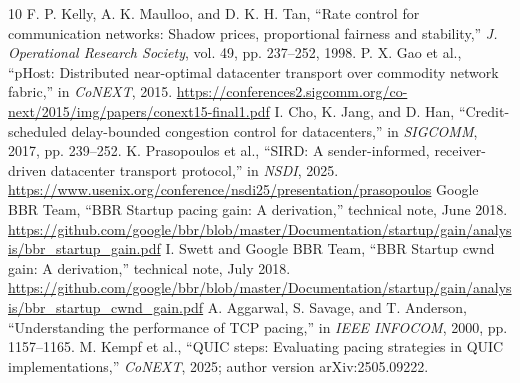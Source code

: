 \documentclass[conference,letterpaper]{IEEEtran}
\begin{document}
\begin{thebibliography}{10}
 F. P. Kelly, A. K. Maulloo, and D. K. H. Tan, ``Rate control for communication networks: Shadow prices, proportional fairness and stability,'' \emph{J. Operational Research Society}, vol. 49, pp. 237--252, 1998.
 P. X. Gao et al., ``pHost: Distributed near-optimal datacenter transport over commodity network fabric,'' in \emph{CoNEXT}, 2015. \url{https://conferences2.sigcomm.org/co-next/2015/img/papers/conext15-final1.pdf}
 I. Cho, K. Jang, and D. Han, ``Credit-scheduled delay-bounded congestion control for datacenters,'' in \emph{SIGCOMM}, 2017, pp. 239--252.
 K. Prasopoulos et al., ``SIRD: A sender-informed, receiver-driven datacenter transport protocol,'' in \emph{NSDI}, 2025. \url{https://www.usenix.org/conference/nsdi25/presentation/prasopoulos}
 Google BBR Team, ``BBR Startup pacing gain: A derivation,'' technical note, June 2018. \url{https://github.com/google/bbr/blob/master/Documentation/startup/gain/analysis/bbr_startup_gain.pdf}
 I. Swett and Google BBR Team, ``BBR Startup cwnd gain: A derivation,'' technical note, July 2018. \url{https://github.com/google/bbr/blob/master/Documentation/startup/gain/analysis/bbr_startup_cwnd_gain.pdf}
 A. Aggarwal, S. Savage, and T. Anderson, ``Understanding the performance of TCP pacing,'' in \emph{IEEE INFOCOM}, 2000, pp. 1157--1165.
 M. Kempf et al., ``QUIC steps: Evaluating pacing strategies in QUIC implementations,'' \emph{CoNEXT}, 2025; author version arXiv:2505.09222.
\end{thebibliography}
\end{document}
